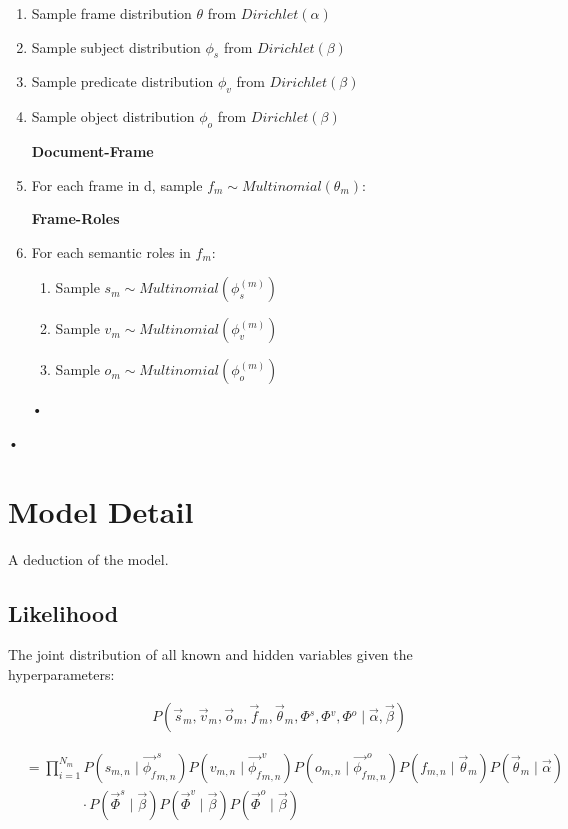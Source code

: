 \documentclass{article}
\begin{document}
\begin{enumerate}
\item Sample frame distribution $\theta$ from $Dirichlet(\alpha)$
\item Sample subject distribution $\phi_s$ from $Dirichlet(\beta)$
\item Sample predicate distribution $\phi_v$ from $Dirichlet(\beta)$
\item Sample object distribution $\phi_o$ from $Dirichlet(\beta)$ \newline

 \textbf{Document-Frame}
\item For each frame in d, sample $f_m \sim Multinomial(\theta_m)$: \newline

\textbf{Frame-Roles}



\item  For each semantic roles in $f_m$:
\begin{enumerate}
\item Sample $s_m \sim Multinomial(\phi_s^{(m)})$
\item Sample $v_m \sim Multinomial(\phi_v^{(m)})$
\item Sample $o_m \sim Multinomial(\phi_o^{(m)})$
\end{enumerate}•

\end{enumerate}•



\section{Model Detail}
A deduction of the model.
\subsection{Likelihood}
The joint distribution of all known and hidden variables given the hyperparameters:

\begin{equation}
\begin{aligned}
&\qquad P(\vec{s}_m, \vec{v}_m, \vec{o}_m, \vec{f}_m, \vec{\theta}_m, \Phi{^s},\Phi{^v}, \Phi{^o} \mid \vec{\alpha}, \vec{\beta})
\end{aligned}
\end{equation}

\begin{equation}
\begin{aligned}
&= \prod_{i=1}^{N_m} 
P(s_{m,n} \mid \vec{\phi_{f}}_{m,n}^s)
P(v_{m,n} \mid \vec{\phi_{f}}_{m,n}^v)
P(o_{m,n} \mid \vec{\phi_{f}}_{m,n}^o)
P(f_{m,n} \mid \vec{\theta}_m)
P(\vec{\theta}_m \mid \vec{\alpha})
\\
& \qquad\qquad\cdot
P(\vec{\Phi}^s \mid \vec{\beta})
P(\vec{\Phi}^v \mid \vec{\beta})
P(\vec{\Phi}^o \mid \vec{\beta})
\end{aligned}
\end{equation}
\end{document}
